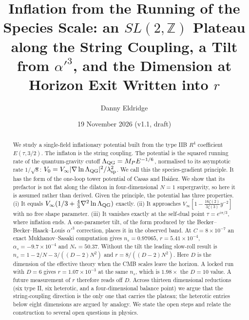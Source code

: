 \documentclass[aps,prd,twocolumn,superscriptaddress,nofootinbib,showkeys]{revtex4-2}
\begin{document}
\title{Inflation from the Running of the Species Scale: an $SL(2,\mathbb Z)$ Plateau along the String Coupling, a Tilt from $\alpha'^3$, and the Dimension at Horizon Exit Written into $r$}
\author{Danny Eldridge}
\date{19 November 2026 (v1.1, draft)}
\begin{abstract}
We study a single-field inflationary potential built from the type IIB $R^4$ coefficient $E(\tau,3/2)$. The inflaton is the string coupling. The potential is the squared running rate of the quantum-gravity cutoff $\Lambda_{\rm QG}=M_P E^{-1/6}$, normalised to its asymptotic rate $1/\sqrt8$: $V_0=V_\infty|\nabla\ln\Lambda_{\rm QG}|^2/\lambda_{\rm sp}^2$. We call this the species-gradient principle. It has the form of the one-loop tower potential of Casas and Ib\'a\~nez. We show that its prefactor is not flat along the dilaton in four-dimensional $N=1$ supergravity, so here it is assumed rather than derived. Given the principle, the potential has three properties. (i) It equals $V_\infty(1/3+\tfrac43\nabla^2\ln\Lambda_{\rm QG})$ exactly. (ii) It approaches $V_\infty[1-\tfrac{16\zeta(2)}{3\zeta(3)}y^{-2}]$ with no free shape parameter. (iii) It vanishes exactly at the self-dual point $\tau=e^{i\pi/3}$, where inflation ends. A one-parameter tilt, of the form produced by the Becker--Becker--Haack--Louis $\alpha'^3$ correction, places it in the observed band. At $C=8\times10^{-7}$ an exact Mukhanov--Sasaki computation gives $n_s=0.97065$, $r=5.41\times10^{-4}$, $\alpha_s=-9.7\times10^{-4}$ and $N_*=50.37$. Without the tilt the leading slow-roll result is $n_s=1-2/N-3/((D-2)N^2)$ and $r=8/((D-2)N^2)$. Here $D$ is the dimension of the effective theory when the CMB scales leave the horizon. A locked run with $D=6$ gives $r=1.07\times10^{-3}$ at the same $n_s$, which is $1.98\times$ the $D=10$ value. A future measurement of $r$ therefore reads off $D$. Across thirteen dimensional reductions (six type II, six heterotic, and a four-dimensional balance point) we argue that the string-coupling direction is the only one that carries the plateau; the heterotic entries below eight dimensions are argued by analogy. We state the open steps and relate the construction to several open questions in physics.
\end{abstract}
\maketitle
\end{document}
